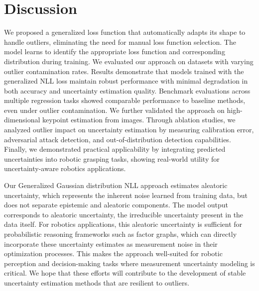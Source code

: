 \documentclass[letterpaper, 10 pt, conference]{ieeeconf}  %
\begin{document}
\section{Discussion}
We proposed a generalized loss function that automatically adapts its shape to handle outliers, eliminating the need for manual loss function selection. The model learns to identify the appropriate loss function and corresponding distribution during training.
We evaluated our approach on datasets with varying outlier contamination rates. Results demonstrate that models trained with the generalized NLL loss maintain robust performance with minimal degradation in both accuracy and uncertainty estimation quality.
Benchmark evaluations across multiple regression tasks showed comparable performance to baseline methods, even under outlier contamination. 
We further validated the approach on high-dimensional keypoint estimation from images. Through ablation studies, we analyzed outlier impact on uncertainty estimation by measuring calibration error, adversarial attack detection, and out-of-distribution detection capabilities.
Finally, we demonstrated practical applicability by integrating predicted uncertainties into robotic grasping tasks, showing real-world utility for uncertainty-aware robotics applications.

Our Generalized Gaussian distribution NLL approach estimates aleatoric uncertainty, which represents the inherent noise learned from training data, but does not separate epistemic and aleatoric components. The model output corresponds to aleatoric uncertainty, the irreducible uncertainty present in the data itself. For robotics applications, this aleatoric uncertainty is sufficient for probabilistic reasoning frameworks such as factor graphs, which can directly incorporate these uncertainty estimates as measurement noise in their optimization processes. This makes the approach well-suited for robotic perception and decision-making tasks where measurement uncertainty modeling is critical.
We hope that these efforts will contribute to the development of stable uncertainty estimation methods that are resilient to outliers.
\end{document}

